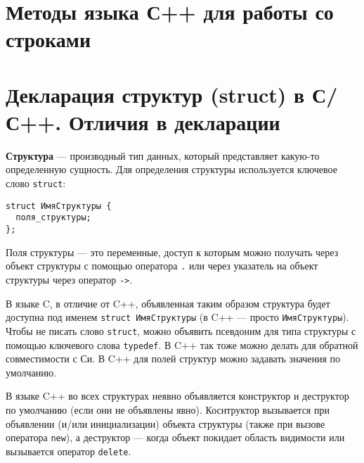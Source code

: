 \documentclass[14pt, a4paper]{extarticle}
\begin{document}
\section{Методы языка С++ для работы со строками}

\section{Декларация структур (struct) в С/С++. Отличия в декларации}
\textbf{Структура} \label{def:struct} --- производный тип данных, который представляет какую-то определенную сущность.
Для определения структуры используется ключевое слово \verb|struct|:

\begin{verbatim}
struct ИмяСтруктуры {
  поля_структуры;
};
\end{verbatim}
Поля структуры --- это переменные, доступ к которым можно получать через объект структуры
с помощью оператора \verb|.| или через указатель на объект структуры через оператор \verb|->|.

В языке C, в отличие от C++, объявленная таким образом структура будет доступна под именем
\verb|struct ИмяСтруктуры| (в C++ --- просто \verb|ИмяСтруктуры|). Чтобы не писать слово
\verb|struct|, можно объявить псевдоним для типа структуры с помощью ключевого слова
\verb|typedef|. В C++ так тоже можно делать для обратной совместимости с Си. В C++
для полей структур можно задавать значения по умолчанию.

{\small В языке C++ во всех структурах неявно объявляется конструктор и деструктор по умолчанию
(если они не объявлены явно). Коснтруктор вызывается при объявлении (и/или инициализации) объекта
структуры (также при вызове оператора \verb|new|), а деструктор --- когда объект покидает
область видимости или вызывается оператор \verb|delete|.}
\end{document}
